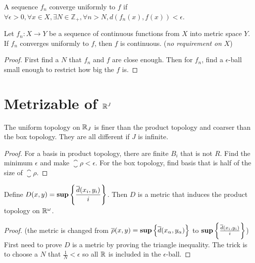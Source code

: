 \begin{definition}\label{converge_uniformly}
    A sequence $f_n$ converge uniformly to $f$ if $\forall \epsilon > 0,\forall x \in X, \exists N \in \mathbb{Z}_{+}, \forall n > N, d \left( f_n (x) , f(x) \right) < \epsilon$.
\end{definition}

\begin{theorem}
    Let $f_n: X \rightarrow Y$ be a sequence of continuous functions from $X$ into metric space $Y$. If $f_n$ converges uniformly to $f$, then $f$ is continuous. (\emph{no requirement on $X$})
\end{theorem}
\begin{proof}
    First find a $N$ that $f_n$ and $f$ are close enough. Then for $f_n$, find a $\epsilon$-ball small enough to restrict how big the $f$ is.
\end{proof}






\section{Metrizable of $\mathbb{R}^J$}


\begin{theorem}
The uniform topology on $\mathbb{R}_{J}$ is finer than the product topology and coarser than the box topology. They are all different if $J$ is infinite.
\end{theorem}
\begin{proof}
    For a basis in product topology, there are finite $B_i$ that is not $R$. Find the minimum $\epsilon$ and make $\closure{\rho} < \epsilon$. For the box topology, find basis that is half of the size of $\closure{\rho}$.
\end{proof}



\begin{theorem}
    Define $\displaystyle D(x,y) = \mathbf{sup} \set{\frac{\overline{d}(x_i, y_i )}{i}} $. Then $D$ is a metric that induces the product topology on $\mathbb{R}^\omega$.
\end{theorem}
\begin{proof}
    (the metric is changed from $\overline{\rho}(x,y) = \mathbf{sup} \set{ \overline{d}(x_{\alpha}, y_{\alpha})} $ to $\mathbf{sup} \set{\frac{\overline{d}(x_i, y_i )}{i}} $) First need to prove $D$ is a metric by proving the triangle inequality. The trick is to choose a $N$ that $\frac{1}{N} < \epsilon$ so all $\mathbb{R}$ is included in the $\epsilon$-ball.
\end{proof}


